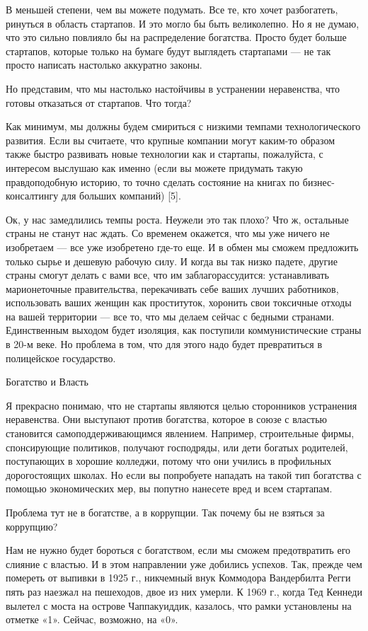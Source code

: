 \documentclass[ebook,12pt,oneside,openany]{memoir}
\begin{document}
В меньшей степени, чем вы можете подумать. Все те, кто хочет
разбогатеть, ринуться в область стартапов. И это могло бы быть
великолепно. Но я не думаю, что это сильно повлияло бы на
распределение богатства. Просто будет больше стартапов, которые только
на бумаге будут выглядеть стартапами — не так просто написать
настолько аккуратно законы.

Но представим, что мы настолько настойчивы в устранении неравенства,
что готовы отказаться от стартапов. Что тогда?

Как минимум, мы должны будем смириться с низкими темпами
технологического развития. Если вы считаете, что крупные компании
могут каким-то образом также быстро развивать новые технологии как и
стартапы, пожалуйста, с интересом выслушаю как именно (если вы можете
придумать такую правдоподобную историю, то точно сделать состояние на
книгах по бизнес-консалтингу для больших компаний) [5].

Ок, у нас замедлились темпы роста. Неужели это так плохо? Что ж,
остальные страны не станут нас ждать. Со временем окажется, что мы уже
ничего не изобретаем — все уже изобретено где-то еще. И в обмен мы
сможем предложить только сырье и дешевую рабочую силу. И когда вы так
низко падете, другие страны смогут делать с вами все, что им
заблагорассудится: устанавливать марионеточные правительства,
перекачивать себе ваших лучших работников, использовать ваших женщин
как проституток, хоронить свои токсичные отходы на вашей территории —
все то, что мы делаем сейчас с бедными странами. Единственным выходом
будет изоляция, как поступили коммунистические страны в 20-м веке. Но
проблема в том, что для этого надо будет превратиться в полицейское
государство.

Богатство и Власть

Я прекрасно понимаю, что не стартапы являются целью сторонников
устранения неравенства. Они выступают против богатства, которое в
союзе с властью становится самоподдерживающимся явлением. Например,
строительные фирмы, спонсирующие политиков, получают господряды, или
дети богатых родителей, поступающих в хорошие колледжи, потому что они
учились в профильных дорогостоящих школах. Но если вы попробуете
нападать на такой тип богатства с помощью экономических мер, вы
попутно нанесете вред и всем стартапам.

Проблема тут не в богатстве, а в коррупции. Так почему бы не взяться
за коррупцию?

Нам не нужно будет бороться с богатством, если мы сможем предотвратить
его слияние с властью. И в этом направлении уже добились успехов. Так,
прежде чем помереть от выпивки в 1925 г., никчемный внук Коммодора
Вандербилта Регги пять раз наезжал на пешеходов, двое из них умерли. К
1969 г., когда Тед Кеннеди вылетел с моста на острове Чаппакуиддик,
казалось, что рамки установлены на отметке «1». Сейчас, возможно, на
«0».
\end{document}

